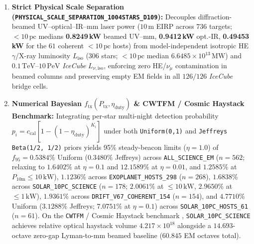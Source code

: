 \documentclass[twocolumn,10pt]{article}
\begin{document}
\begin{enumerate}
  \item \textbf{Strict Physical Scale Separation (\texttt{PHYSICAL\_SCALE\_SEPARATION\_1004STARS\_D109}):} Decouples diffraction-beamed UV--optical--IR--mm laser power ($10\,\text{m}$ EIRP across $736$ targets; $<10\,\text{pc}$ medians \textbf{0.8249\,kW} beamed UV--mm, \textbf{0.9412\,kW} opt.-IR, \textbf{0.49453\,kW} for the $61$ coherent $<10\,\text{pc}$ hosts) from model-independent isotropic HE $\gamma$/X-ray luminosity $L_{\mathrm{iso}}$ ($306$ stars; $<10\,\text{pc}$ median $6.6485\times 10^{13}\,\text{MW}$) and $0.1\,\mathrm{TeV}\text{--}10\,\mathrm{PeV}$ \textit{IceCube} $L_{\nu,\mathrm{iso}}$, enforcing zero HE/$\nu_\mu$ contamination in beamed columns and preserving empty EM fields in all $126/126$ \textit{IceCube} bridge cells.
  \item \textbf{Numerical Bayesian $f_{\mathrm{tx}}(P_{\mathrm{tx}}, \eta_{\mathrm{duty}})$ \& CWTFM / Cosmic Haystack Benchmark:} Integrating per-star multi-night detection probability $p_i = c_{\mathrm{cal}}[1 - (1 - \eta_{\mathrm{duty}})^{K_i}]$ under both \texttt{Uniform(0,1)} and \texttt{Jeffreys Beta(1/2, 1/2)} priors yields 95\% steady-beacon limits ($\eta=1.0$) of $f_{95} = \mathbf{0.5384\%}$ Uniform ($\mathbf{0.3480\%}$ Jeffreys) across \texttt{ALL\_SCIENCE\_EM} ($n=562$; relaxing to $1.6402\%$ at $\eta=0.1$ and $12.1589\%$ at $\eta=0.01$, and $1.2585\%$ at $P_{10\mathrm{m}} \le 10\,\text{kW}$), $\mathbf{1.1236\%}$ across \texttt{EXOPLANET\_HOSTS\_298} ($n=268$), $\mathbf{1.6838\%}$ across \texttt{SOLAR\_10PC\_SCIENCE} ($n=178$; $2.0061\%$ at $\le 10\,\text{kW}$, $2.9650\%$ at $\le 1\,\text{kW}$), $\mathbf{1.9361\%}$ across \texttt{DRIFT\_V67\_COHERENT\_154} ($n=154$), and $\mathbf{4.7710\%}$ Uniform ($\mathbf{3.1288\%}$ Jeffreys; $7.0751\%$ at $\eta=0.1$) across \texttt{SOLAR\_10PC\_HOSTS\_61} ($n=61$). On the \texttt{CWTFM} / Cosmic Haystack benchmark \cite{TellisMarcy2017,Lipman2019,Zuckerman2023,Enriquez2017,Wright2018,Price2020}, \texttt{SOLAR\_10PC\_SCIENCE} achieves relative optical haystack volume $4.217\times 10^{18}$ alongside a $14.693$-octave zero-gap Lyman-to-mm beamed baseline ($60.845$ EM octaves total).
\end{enumerate}
\end{document}
